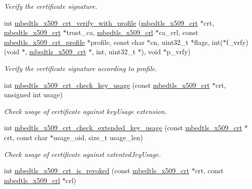 \begin{DoxyCompactItemize}
\begin{DoxyCompactList}\small\item\em Verify the certificate signature. \end{DoxyCompactList}\item 
int \hyperlink{group__x509__module_gaf044a51e5b5bc854bf12aeeccb440e55}{mbedtls\-\_\-x509\-\_\-crt\-\_\-verify\-\_\-with\-\_\-profile} (\hyperlink{structmbedtls__x509__crt}{mbedtls\-\_\-x509\-\_\-crt} $\ast$crt, \hyperlink{structmbedtls__x509__crt}{mbedtls\-\_\-x509\-\_\-crt} $\ast$trust\-\_\-ca, \hyperlink{structmbedtls__x509__crl}{mbedtls\-\_\-x509\-\_\-crl} $\ast$ca\-\_\-crl, const \hyperlink{structmbedtls__x509__crt__profile}{mbedtls\-\_\-x509\-\_\-crt\-\_\-profile} $\ast$profile, const char $\ast$cn, uint32\-\_\-t $\ast$flags, int($\ast$f\-\_\-vrfy)(void $\ast$, \hyperlink{structmbedtls__x509__crt}{mbedtls\-\_\-x509\-\_\-crt} $\ast$, int, uint32\-\_\-t $\ast$), void $\ast$p\-\_\-vrfy)
\begin{DoxyCompactList}\small\item\em Verify the certificate signature according to profile. \end{DoxyCompactList}\item 
int \hyperlink{group__x509__module_ga0ab7857ffd82467207e718bb9f0131a2}{mbedtls\-\_\-x509\-\_\-crt\-\_\-check\-\_\-key\-\_\-usage} (const \hyperlink{structmbedtls__x509__crt}{mbedtls\-\_\-x509\-\_\-crt} $\ast$crt, unsigned int usage)
\begin{DoxyCompactList}\small\item\em Check usage of certificate against key\-Usage extension. \end{DoxyCompactList}\item 
int \hyperlink{group__x509__module_gad21c0e75a3fdbeb1f65e4d339e479df3}{mbedtls\-\_\-x509\-\_\-crt\-\_\-check\-\_\-extended\-\_\-key\-\_\-usage} (const \hyperlink{structmbedtls__x509__crt}{mbedtls\-\_\-x509\-\_\-crt} $\ast$crt, const char $\ast$usage\-\_\-oid, size\-\_\-t usage\-\_\-len)
\begin{DoxyCompactList}\small\item\em Check usage of certificate against extented\-Jey\-Usage. \end{DoxyCompactList}\item 
int \hyperlink{group__x509__module_ga0dc256a70f90cb68002d53bafffab232}{mbedtls\-\_\-x509\-\_\-crt\-\_\-is\-\_\-revoked} (const \hyperlink{structmbedtls__x509__crt}{mbedtls\-\_\-x509\-\_\-crt} $\ast$crt, const \hyperlink{structmbedtls__x509__crl}{mbedtls\-\_\-x509\-\_\-crl} $\ast$crl)

\end{DoxyCompactItemize}
